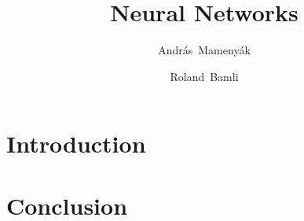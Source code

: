 \documentclass[a4paper]{article}
\author{Andr\'as~Mameny\'ak}
\author{Roland~Bamli}
\affil{Major in Information Technology Engineering (BSc), University of Debrecen}
\title{Neural Networks}
\begin{document}
\maketitle

\section{Introduction}

\section{Conclusion}
\end{document}

